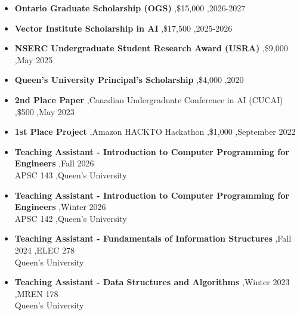 \documentclass[letterpaper,10pt]{article}
\begin{document}


\begin{itemize}

\item \textbf{Ontario Graduate Scholarship (OGS)} \sep \$15,000 \sep 2026-2027

\item \textbf{Vector Institute Scholarship in AI} \sep \$17,500 \sep 2025-2026 

\item \textbf{NSERC Undergraduate Student Research Award (USRA)} \sep \$9,000 \sep May 2025

\item \textbf{Queen's University Principal's Scholarship} \sep \$4,000 \sep 2020

\item
  \textbf{2nd Place Paper}
  \sep Canadian Undergraduate Conference in AI (CUCAI) \sep \$500 \sep May 2023

\item
  \textbf{1st Place Project}
  \sep Amazon HACKTO Hackathon \sep \$1,000 \sep September 2022
\end{itemize}



\begin{itemize}

\item
  \textbf{Teaching Assistant - Introduction to Computer Programming for Engineers} \sep Fall 2026\\ APSC 143 \sep Queen's University

\item
  \textbf{Teaching Assistant - Introduction to Computer Programming for Engineers} \sep Winter 2026 \\ APSC 142 \sep Queen's University

\item
  \textbf{Teaching Assistant - Fundamentals of Information Structures} \sep Fall 2024 \sep ELEC 278 \\ Queen's University

\item
  \textbf{Teaching Assistant - Data Structures and Algorithms} \sep Winter 2023 \sep MREN 178\\ Queen's University

\end{itemize}
\end{document}

